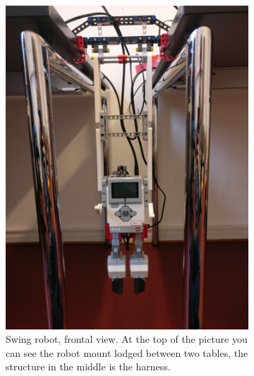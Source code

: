 \documentclass[11pt, a4paper]{article}
\begin{document}
	\begin{figure}[H]
		\centering
		\begin{subfigure}{.48\textwidth}
			\centering
			\includegraphics[width=1\linewidth]{images/swing_robot_front_full}
			\caption{Swing robot, frontal view. At the top of the picture you can see the robot mount lodged between two tables, the structure in the middle is the harness.}
			\label{fig:swing_robot_front}
		\end{subfigure}
		\begin{subfigure}{.48\textwidth}
			\centering

\end{subfigure}
\end{figure}
\end{document}
